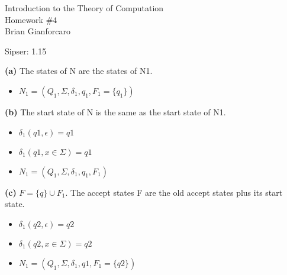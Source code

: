 \documentclass[11pt]{article}
\newcommand{\question}[2] {\vspace{.25in} \fbox{#1} #2 \vspace{.10in}}
\renewcommand{\part}[1] {\vspace{.10in} {\bf (#1)}}
\begin{document}
\medskip                        %


\begin{center}                  %
  {\Large Introduction to the Theory of Computation \\ Homework \#4} \\
  Brian Gianforcaro \\
  \date \\
\end{center}

\ttfamily

\question{1}{Sipser: 1.15}
 
\part{a} The states of N are the states of N1. 
\begin{center}
  \begin{itemize}
    \item $N_1 = (Q_1,\Sigma,{\delta}_1,q_1, F_1 = \{ q_1 \}) $
  \end{itemize}
\end{center}


\part{b} The start state of N is the same as the start state of N1. 
\begin{center}
  \begin{itemize}
    \item ${\delta}_1(q1,\epsilon) = q1 $
    \item ${\delta}_1(q1, x \in \Sigma ) = q1 $
    \item $N_1 = (Q_1,\Sigma,{\delta}_1,q_1, F_1) $
  \end{itemize}
\end{center}


\part{c} $F =\{q\}\cup F_1$.  The accept states F are the old accept states plus its start state. 
\begin{center}
  \begin{itemize}
    \item ${\delta}_1(q2,\epsilon) = q2 $
    \item ${\delta}_1(q2, x \in \Sigma ) = q2 $
    \item $N_1 = (Q_1,\Sigma,{\delta}_1, q1, F_1 = \{ q2 \} ) $
  \end{itemize}
\end{center}
\end{document}
